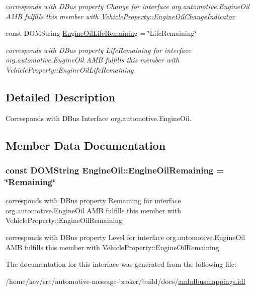 \begin{DoxyCompactItemize}
\begin{DoxyCompactList}\small\item\em corresponds with D\+Bus property Change for interface org.\+automotive.\+Engine\+Oil A\+M\+B fulfills this member with \hyperlink{classVehicleProperty_a6d35870db03580d6e912fc49dd889bc7}{Vehicle\+Property\+::\+Engine\+Oil\+Change\+Indicator} \end{DoxyCompactList}\item 
\hypertarget{interfaceEngineOil_aaf63ba970af16d0c7d914b3c5dcdddc2}{const D\+O\+M\+String \hyperlink{interfaceEngineOil_aaf63ba970af16d0c7d914b3c5dcdddc2}{Engine\+Oil\+Life\+Remaining} = \char`\"{}Life\+Remaining\char`\"{}}\label{interfaceEngineOil_aaf63ba970af16d0c7d914b3c5dcdddc2}

\begin{DoxyCompactList}\small\item\em corresponds with D\+Bus property Life\+Remaining for interface org.\+automotive.\+Engine\+Oil A\+M\+B fulfills this member with Vehicle\+Property\+::\+Engine\+Oil\+Life\+Remaining \end{DoxyCompactList}\end{DoxyCompactItemize}


\subsection{Detailed Description}
Corresponds with D\+Bus Interface org.\+automotive.\+Engine\+Oil. 

\subsection{Member Data Documentation}
\hypertarget{interfaceEngineOil_a28a148b5fcbf4d61ab438f229870e997}{
\subsubsection[{Engine\+Oil\+Remaining}]{\setlength{\rightskip}{0pt plus 5cm}const D\+O\+M\+String Engine\+Oil\+::\+Engine\+Oil\+Remaining = \char`\"{}Remaining\char`\"{}}}\label{interfaceEngineOil_a28a148b5fcbf4d61ab438f229870e997}


corresponds with D\+Bus property Remaining for interface org.\+automotive.\+Engine\+Oil A\+M\+B fulfills this member with Vehicle\+Property\+::\+Engine\+Oil\+Remaining 

corresponds with D\+Bus property Level for interface org.\+automotive.\+Engine\+Oil A\+M\+B fulfills this member with Vehicle\+Property\+::\+Engine\+Oil\+Remaining 

The documentation for this interface was generated from the following file\+:\begin{DoxyCompactItemize}
\item 
/home/kev/src/automotive-\/message-\/broker/build/docs/\hyperlink{ambdbusmappings_8idl}{ambdbusmappings.\+idl}\end{DoxyCompactItemize}
